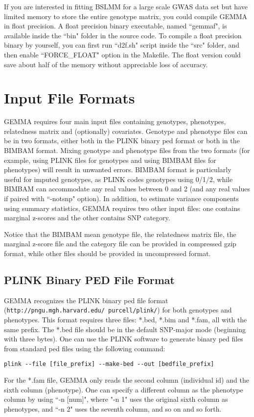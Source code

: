 \documentclass[11pt]{article}
\providecommand{\url}[1]{\texttt{#1}}
\begin{document}
If you are interested in fitting BSLMM for a large scale GWAS data set but have limited memory to store the entire genotype matrix, you could compile GEMMA in float precision. A float precision binary executable, named ``gemmaf",  is available inside the ``bin" folder in the source code. To compile a float precision binary by yourself, you can first run ``d2f.sh" script inside the ``src" folder, and then enable ``FORCE\_FLOAT" option in the Makefile. The float version could save about half of the memory without appreciable loss of accuracy.

\newpage
\section{Input File Formats}
GEMMA requires four main input files containing genotypes, phenotypes, relatedness matrix and (optionally) covariates. Genotype and phenotype files can be in two formats, either both in the PLINK binary ped format or both in the BIMBAM format. Mixing genotype and phenotype files from the two formats (for example, using PLINK files for genotypes and using BIMBAM files for phenotypes) will result in unwanted errors. BIMBAM format is particularly useful for imputed genotypes, as PLINK codes genotypes using 0/1/2, while BIMBAM can accommodate any real values between 0 and 2 (and any real values if paired with ``-notsnp" option). In addition, to estimate variance components using summary statistics, GEMMA requires two other input files: one contains marginal z-scores and the other contains SNP category. 

Notice that the BIMBAM mean genotype file, the relatedness matrix file, the marginal z-score file and the category file can be provided in compressed gzip format, while other files should be provided in uncompressed format.

\subsection{PLINK Binary PED File Format}
GEMMA recognizes the PLINK binary ped file format (\url{http://pngu.mgh.harvard.edu/~purcell/plink/}) \cite{Purcell:2007} for both genotypes and phenotypes. This format requires three files: *.bed, *.bim and *.fam, all with the same prefix. The *.bed file should be in the default SNP-major mode (beginning with three bytes). One can use the PLINK software to generate binary ped files from standard ped files using the following command:
%
\begin{verbatim}
plink --file [file_prefix] --make-bed --out [bedfile_prefix]
\end{verbatim}
%
For the *.fam file, GEMMA only reads the second column (individual id) and the sixth column (phenotype). One can specify a different column as the phenotype column by using ``-n [num]", where "-n 1" uses the original sixth column as phenotypes, and ``-n 2" uses the seventh column, and so on and so forth. 
\end{document}
